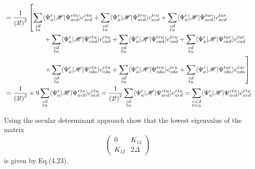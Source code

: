 \documentclass[a4paper]{book}
\begin{document}
\begin{solution}
\begin{align}
		&= \frac{1}{\left(3!\right)^2}  \left[ \sum_{ \substack{ cd \\ tu } } \langle \Psi^r_a | \mathscr{H} | \Psi^{rtu}_{acd} \rangle c^{rtu}_{acd} + \sum_{ \substack{ cd \\ tu } } \langle \Psi^r_a | \mathscr{H} | \Psi^{tru}_{acd} \rangle c^{tru}_{acd} + \sum_{ \substack{ cd \\ tu } } \langle \Psi^r_a | \mathscr{H} | \Psi^{tur}_{acd} \rangle c^{tur}_{acd} \right. \notag \\
		&\hspace{ 6em } + \sum_{ \substack{ cd \\ tu } } \langle \Psi^r_a | \mathscr{H} | \Psi^{rtu}_{cad} \rangle c^{rtu}_{cad} + \sum_{ \substack{ cd \\ tu } } \langle \Psi^r_a | \mathscr{H} | \Psi^{tru}_{cad} \rangle c^{tru}_{cad} + \sum_{ \substack{ cd \\ tu } } \langle \Psi^r_a | \mathscr{H} | \Psi^{tur}_{cad} \rangle c^{tur}_{cad} \notag \\
		&\hspace{ 6em } \left. + \sum_{ \substack{ cd \\ tu } } \langle \Psi^r_a | \mathscr{H} | \Psi^{rtu}_{cda} \rangle c^{rtu}_{cda} + \sum_{ \substack{ cd \\ tu } } \langle \Psi^r_a | \mathscr{H} | \Psi^{tru}_{cda} \rangle c^{tru}_{cda} + \sum_{ \substack{ cd \\ tu } } \langle \Psi^r_a | \mathscr{H} | \Psi^{tur}_{cda} \rangle c^{tur}_{cda} \right] \notag \\
		&= \frac{1}{\left(3!\right)^2} \times 9 \sum_{ \substack{ cd \\ tu } } \langle \Psi^r_a | \mathscr{H} | \Psi^{rtu}_{acd} \rangle c^{rtu}_{acd} = \frac{1}{\left(2!\right)^2} \sum_{ \substack{ cd \\ tu } } \langle \Psi^r_a | \mathscr{H} | \Psi^{rtu}_{acd} \rangle c^{rtu}_{acd} = \sum_{ \substack{ c<d \\ t<u } } \langle \Psi^r_a | \mathscr{H} | \Psi^{rtu}_{acd} \rangle c^{rtu}_{acd}
	\end{align}
	
	\end{solution}
	
	\begin{exercise}
	Using the secular determinant approach show that the lowest eigenvalue of the matrix
	\[
		\begin{pmatrix}
			0 & K_{12} \\ K_{12} & 2\Delta
		\end{pmatrix}
	\]
	is given by Eq.(4.23).
	\end{exercise}
	
\end{document}
